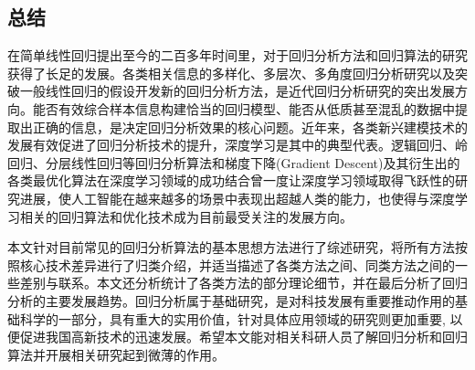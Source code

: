\documentclass[a4paper]{ctexart}
\begin{document}
\begin{spacing}{1.3}
	\section{总结}
	在简单线性回归提出至今的二百多年时间里，对于回归分析方法和回归算法的研究获得了长足的发展。各类相关信息的多样化、多层次、多角度回归分析研究以及突破一般线性回归的假设开发新的回归分析方法，是近代回归分析研究的突出发展方向。能否有效综合样本信息构建恰当的回归模型、能否从低质甚至混乱的数据中提取出正确的信息，是决定回归分析效果的核心问题。近年来，各类新兴建模技术的发展有效促进了回归分析技术的提升，深度学习是其中的典型代表。逻辑回归、岭回归、分层线性回归等回归分析算法和梯度下降(Gradient Descent)及其衍生出的各类最优化算法在深度学习领域的成功结合曾一度让深度学习领域取得飞跃性的研究进展，使人工智能在越来越多的场景中表现出超越人类的能力，也使得与深度学习相关的回归算法和优化技术成为目前最受关注的发展方向。
	
	本文针对目前常见的回归分析算法的基本思想方法进行了综述研究，将所有方法按照核心技术差异进行了归类介绍，并适当描述了各类方法之间、同类方法之间的一些差别与联系。本文还分析统计了各类方法的部分理论细节，并在最后分析了回归分析的主要发展趋势。回归分析属于基础研究，是对科技发展有重要推动作用的基础科学的一部分，具有重大的实用价值，针对具体应用领域的研究则更加重要, 以便促进我国高新技术的迅速发展。希望本文能对相关科研人员了解回归分析和回归算法并开展相关研究起到微薄的作用。
	
\end{spacing}


\end{document}
